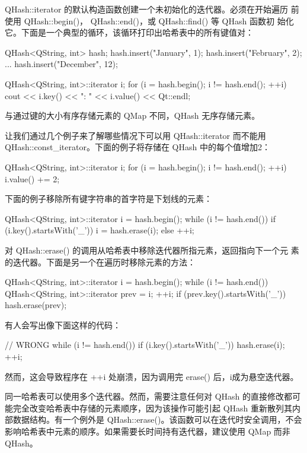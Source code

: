 QHash::iterator 的默认构造函数创建一个未初始化的迭代器。必须在开始遍历
前使用 QHash::begin()， QHash::end()，或 QHash::find() 等 QHash 函数初
始化它。下面是一个典型的循环，该循环打印出哈希表中的所有键值对：

\begin{cppcode}
QHash<QString, int> hash;
hash.insert("January", 1);
hash.insert("February", 2);
...
hash.insert("December", 12);

QHash<QString, int>::iterator i;
for (i = hash.begin(); i != hash.end(); ++i)
    cout << i.key() << ": " << i.value() << Qt::endl;
\end{cppcode}

与通过键的大小有序存储元素的 QMap 不同，QHash 无序存储元素。

让我们通过几个例子来了解哪些情况下可以用 QHash::iterator 而不能用 QHash::const\_iterator。下面的例子将存储在 QHash 中的每个值增加2：

\begin{cppcode}
QHash<QString, int>::iterator i;
for (i = hash.begin(); i != hash.end(); ++i)
    i.value() += 2;
\end{cppcode}

下面的例子移除所有键字符串的首字符是下划线的元素：

\begin{cppcode}
QHash<QString, int>::iterator i = hash.begin();
while (i != hash.end()) {
    if (i.key().startsWith('_'))
        i = hash.erase(i);
    else
        ++i;
}
\end{cppcode}

对 QHash::erase() 的调用从哈希表中移除迭代器所指元素，返回指向下一个元
素的迭代器。下面是另一个在遍历时移除元素的方法：

\begin{cppcode}
QHash<QString, int>::iterator i = hash.begin();
while (i != hash.end()) {
    QHash<QString, int>::iterator prev = i;
    ++i;
    if (prev.key().startsWith('_'))
        hash.erase(prev);
}
\end{cppcode}

有人会写出像下面这样的代码：

\begin{cppcode}
// WRONG
while (i != hash.end()) {
    if (i.key().startsWith('_'))
        hash.erase(i);
    ++i;
}
\end{cppcode}

然而，这会导致程序在 ++i 处崩溃，因为调用完 erase() 后，i成为悬空迭代器。

同一哈希表可以使用多个迭代器。然而，需要注意任何对 QHash 的直接修改都可能完全改变哈希表中存储的元素顺序，因为该操作可能引起 QHash 重新散列其内部数据结构。有一个例外是 QHash::erase()。该函数可以在迭代时安全调用，不会影响哈希表中元素的顺序。如果需要长时间持有迭代器，建议使用 QMap 而非 QHash。

